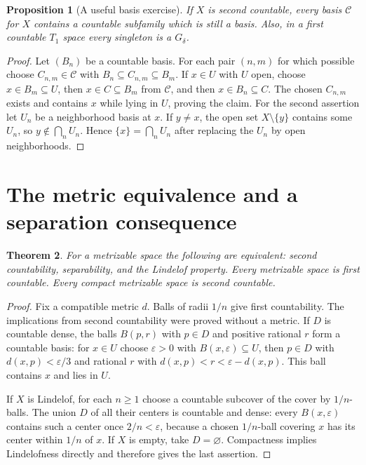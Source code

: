 \documentclass[11pt,oneside,openany]{book}
\newtheorem{theorem}{Theorem}[chapter]
\newtheorem{proposition}[theorem]{Proposition}
\theoremstyle{definition}
\theoremstyle{remark}
\newcommand{\eps}{\varepsilon}
\begin{document}
\begin{proposition}[A useful basis exercise]\label{d10:08:basis-extraction}
If $X$ is second countable, every basis $\mathcal C$ for $X$ contains a countable subfamily which is still a basis. Also, in a first countable $T_1$ space every singleton is a $G_\delta$.
\end{proposition}
\begin{proof}
Let $(B_n)$ be a countable basis. For each pair $(n,m)$ for which possible choose $C_{n,m}\in\mathcal C$ with $B_n\subseteq C_{n,m}\subseteq B_m$. If $x\in U$ with $U$ open, choose $x\in B_m\subseteq U$, then $x\in C\subseteq B_m$ from $\mathcal C$, and then $x\in B_n\subseteq C$. The chosen $C_{n,m}$ exists and contains $x$ while lying in $U$, proving the claim. For the second assertion let $U_n$ be a neighborhood basis at $x$. If $y\ne x$, the open set $X\setminus\{y\}$ contains some $U_n$, so $y\notin\bigcap_nU_n$. Hence $\{x\}=\bigcap_nU_n$ after replacing the $U_n$ by open neighborhoods.
\end{proof}

\section{The metric equivalence and a separation consequence}
\begin{theorem}\label{d10:08:metric-equivalence}
For a metrizable space the following are equivalent: second countability, separability, and the Lindelof property. Every metrizable space is first countable. Every compact metrizable space is second countable.
\end{theorem}
\begin{proof}
Fix a compatible metric $d$. Balls of radii $1/n$ give first countability. The implications from second countability were proved without a metric. If $D$ is countable dense, the balls $B(p,r)$ with $p\in D$ and positive rational $r$ form a countable basis: for $x\in U$ choose $\eps>0$ with $B(x,\eps)\subseteq U$, then $p\in D$ with $d(x,p)<\eps/3$ and rational $r$ with $d(x,p)<r<\eps-d(x,p)$. This ball contains $x$ and lies in $U$.

If $X$ is Lindelof, for each $n\geq1$ choose a countable subcover of the cover by $1/n$-balls. The union $D$ of all their centers is countable and dense: every $B(x,\eps)$ contains such a center once $2/n<\eps$, because a chosen $1/n$-ball covering $x$ has its center within $1/n$ of $x$. If $X$ is empty, take $D=\varnothing$. Compactness implies Lindelofness directly and therefore gives the last assertion.
\end{proof}
\end{document}
